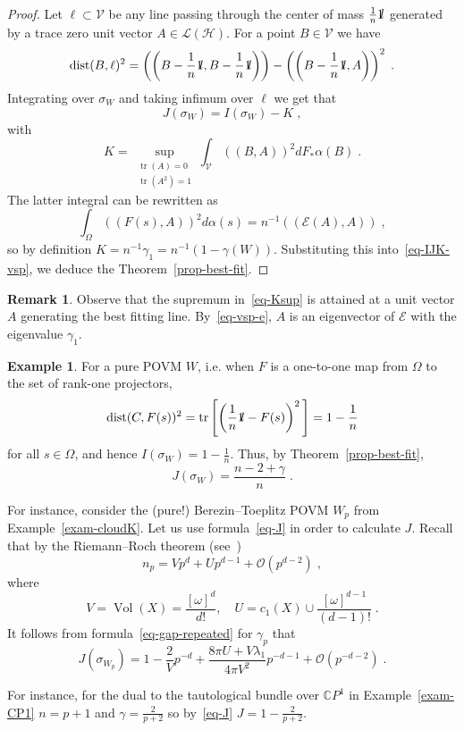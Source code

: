 \documentclass[11pt]{article}
\theoremstyle{definition}
\newtheorem{exam}[theo]{Example}
\newtheorem{rema}[theo]{Remark}
\numberwithin{equation}{section}
\numberwithin{figure}{section}
\numberwithin{table}{section}
\DeclareMathOperator{\Vol}{Vol}
\DeclareMathOperator{\tr}{tr}
\newcommand{\CCC}{{\mathbb{C}}}
\newcommand{\cE}{{\mathcal{E}}}
\newcommand{\cV}{{\mathcal{V}}}
\newcommand*\id{{1\hskip-2.5pt{\rm l}}}
\newcommand{\bigo}{\mathcal{O}}
\newcommand{\Hilb}{\mathcal{H}}
\newcommand\< {\mathcal{h}}
\renewcommand\> {\mathcal{i}}
\newcommand*\cL{\mathscr{L}}
\begin{document}
\begin{proof}
Let $\ell \subset \cV$ be any line passing through the center of mass $\frac{1}{n}\id$
generated by a trace zero unit vector $A \in \cL(\Hilb)$. For a point $B \in \cV$ we have
\[
\text{dist}(B,\ell)^2= \left(\left(B-\frac{1}{n}\id,B-\frac{1}{n}\id\right)\right)- \left(\left(B-\frac{1}{n}\id,A\right)\right)^2\;.
\]
Integrating over $\sigma_W$ and taking infimum over $\ell$ we get that
\begin{equation}\label{eq-IJK-vsp}
J(\sigma_W) = I(\sigma_W) - K\;,
\end{equation}
with
\begin{equation}\label{eq-Ksup}
K= \sup_{\substack{\tr(A)=0 \\ \tr(A^2)=1}} \int_\cV ((B,A))^2 dF_*\alpha(B)\;.
\end{equation}
The latter integral can be rewritten as
\begin{equation}\label{eq-vsp-e}
\int_\Omega ((F(s),A))^2 d\alpha(s) = n^{-1}((\cE(A), A))\;,
\end{equation}
so by definition $K = n^{-1}\gamma_1= n^{-1}(1-\gamma(W))$. Substituting this into~\eqref{eq-IJK-vsp}, we deduce the Theorem~\ref{prop-best-fit}.
\end{proof}

\begin{rema}\label{rem-eigenv}
Observe that the supremum in~\eqref{eq-Ksup} is attained at a unit vector $A$
generating the best fitting line. By~\eqref{eq-vsp-e}, $A$ is an eigenvector of $\cE$ with the eigenvalue $\gamma_1$.
\end{rema}

\begin{exam}
For a pure POVM $W$, i.e. when $F$ is a one-to-one map from $\Omega$ to the set of rank-one projectors,
\[
\text{dist}(C,F(s))^2
= \tr\left[\left(\frac{1}{n}\id -F(s)\right)^2\,\right]
= 1-\frac{1}{n}
\]
for all $s \in \Omega$, and hence $I(\sigma_W)= 1-\frac{1}{n}$. Thus, by Theorem~\ref{prop-best-fit},
\begin{equation}\label{eq-J}
J(\sigma_W)= \frac{n-2+\gamma}{n}\;.
\end{equation}

For instance, consider the (pure!) Berezin--Toeplitz POVM $W_p$ from Example~\ref{exam-cloudK}. Let us use formula~\eqref{eq-J} in order to calculate $J$. Recall that by the Riemann--Roch theorem (see~\cite[Propositions~2.25 and 4.21]{Fine-lectures})
\[
n_p = Vp^d + Up^{d-1}+ \bigo\left(p^{d-2}\right)\;,
\]
where
\[
V= \Vol(X) = \frac{[\omega]^d}{d!},\quad U = c_1(X) \cup \frac{[\omega]^{d-1}}{(d-1)!}\;.
\]
It follows from formula~\eqref{eq-gap-repeated} for $\gamma_p$ that
\[
J(\sigma_{W_p})= 1 -\frac{2}{V}p^{-d} + \frac{8\pi U+ V\lambda_1}{4\pi V^2} p^{-d-1} +\bigo\left(p^{-d-2}\right)\;.
\]

For instance, for the dual to the tautological bundle over $\CCC P^1$ in Example~\ref{exam-CP1} $n=p+1$ and $\gamma= \frac{2}{p+2}$ so by~\eqref{eq-J} $J = 1- \frac{2}{p+2}$.
\end{exam}
\end{document}

